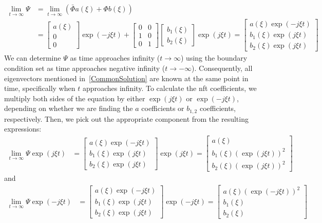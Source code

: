$$
\begin{aligned}
\lim _{t \rightarrow \infty} \Psi & =\lim _{t \rightarrow \infty}\left(\bar{\Phi} a(\xi)+\Phi b(\xi)\right) \\
& =\left[\begin{array}{c}
a(\xi) \\
0 \\
0
\end{array}\right] \exp (-j \xi t)+\left[\begin{array}{ll}
0 & 0 \\
1 & 0 \\
0 & 1
\end{array}\right]\left[\begin{array}{l}
b_{1}(\xi) \\
b_{2}(\xi)
\end{array}\right] \exp (j \xi t)
 =\left[\begin{array}{c}
a(\xi) \exp (-j \xi t) \\
b_{1}(\xi) \exp (j \xi t) \\
b_{2}(\xi) \exp (j \xi t)
\end{array}\right]
\end{aligned}
$$
We can determine \(\Psi\) as time approaches infinity (\(t \rightarrow \infty\)) using the boundary condition set as time approaches negative infinity (\(t \rightarrow -\infty\)). Consequently, all eigenvectors mentioned in~\eqref{CommonSolution} are known at the same point in time, specifically when \(t\) approaches infinity. To calculate the \acrlong{nft} coefficients, we multiply both sides of the equation by either \(\exp (j \xi t)\) or \(\exp (-j \xi t)\), depending on whether we are finding the \(a\) coefficients or \(b_{1,2}\) coefficients, respectively. Then, we pick out the appropriate component from the resulting expressions:
$$
\begin{aligned}
\lim _{t \rightarrow \infty} \Psi \exp (j \xi t) & =\left[\begin{array}{c}
a(\xi) \exp (-j \xi t) \\
b_1(\xi) \exp (j \xi t) \\
b_2(\xi) \exp (j \xi t)
\end{array}\right] \exp (j \xi t) =\left[\begin{array}{c}
a(\xi) \\
b_1(\xi)(\exp (j \xi t))^2 \\
b_2(\xi)(\exp (j \xi t))^2
\end{array}\right]
\end{aligned}
$$
and
$$
\begin{aligned}
\lim _{t \rightarrow \infty} \Psi \exp (-j \xi t) & =\left[\begin{array}{c}
a(\xi) \exp (-j \xi t) \\
b_1(\xi) \exp (j \xi t) \\
b_2(\xi) \exp (j \xi t)
\end{array}\right] \exp (-j \xi t) =\left[\begin{array}{c}
a(\xi)(\exp (-j \xi t))^2 \\
b_1(\xi) \\
b_2(\xi)
\end{array}\right]
\end{aligned}
$$


